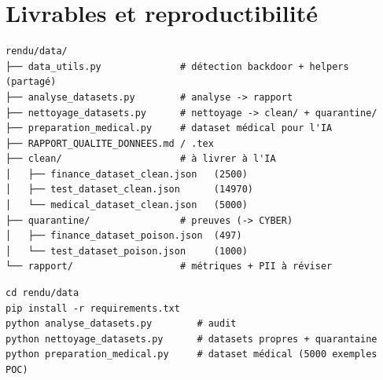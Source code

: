 \documentclass[11pt,a4paper]{article}
\begin{document}
\section{Livrables et reproductibilité}

\begin{verbatim}
rendu/data/
├── data_utils.py              # détection backdoor + helpers (partagé)
├── analyse_datasets.py        # analyse -> rapport
├── nettoyage_datasets.py      # nettoyage -> clean/ + quarantine/
├── preparation_medical.py     # dataset médical pour l'IA
├── RAPPORT_QUALITE_DONNEES.md / .tex
├── clean/                     # à livrer à l'IA
│   ├── finance_dataset_clean.json   (2500)
│   ├── test_dataset_clean.json      (14970)
│   └── medical_dataset_clean.json   (5000)
├── quarantine/                # preuves (-> CYBER)
│   ├── finance_dataset_poison.json  (497)
│   └── test_dataset_poison.json     (1000)
└── rapport/                   # métriques + PII à réviser
\end{verbatim}

\begin{verbatim}
cd rendu/data
pip install -r requirements.txt
python analyse_datasets.py        # audit
python nettoyage_datasets.py      # datasets propres + quarantaine
python preparation_medical.py     # dataset médical (5000 exemples POC)
\end{verbatim}
\end{document}
